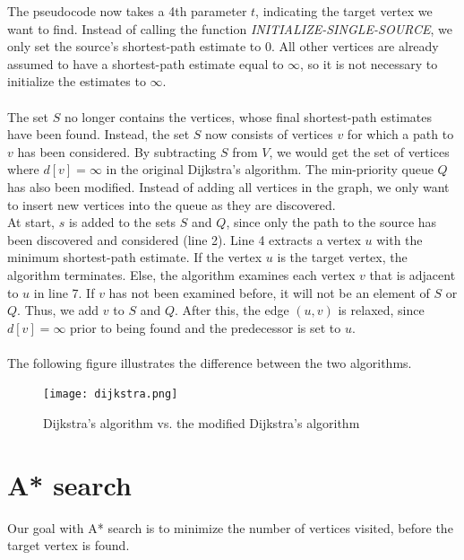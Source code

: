 \documentclass[11pt]{article}
\begin{document}
\noindent The pseudocode now takes a 4th parameter $t$, indicating the target vertex we want to find. Instead of calling the function \textit{INITIALIZE-SINGLE-SOURCE}, we only set the source's shortest-path estimate to 0. All other vertices are already assumed to have a shortest-path estimate equal to $\infty$, so it is not necessary to initialize the estimates to $\infty$.\\\\
The set $S$ no longer contains the vertices, whose final shortest-path estimates have been found. Instead, the set $S$ now consists of vertices $v$ for which a path to $v$ has been considered. By subtracting $S$ from $V$, we would get the set of vertices where $d[v]=\infty$ in the original Dijkstra's algorithm. The min-priority queue $Q$ has also been modified. Instead of adding all vertices in the graph, we only want to insert new vertices into the queue as they are discovered.\\ 
At start, $s$ is added to the sets $S$ and $Q$, since only the path to the source has been discovered and considered (line 2). Line 4 extracts a vertex $u$ with the minimum shortest-path estimate. If the vertex $u$ is the target vertex, the algorithm terminates. Else, the algorithm examines each vertex $v$ that is adjacent to $u$ in line 7. If $v$ has not been examined before, it will not be an element of $S$ or $Q$. Thus, we add $v$ to $S$ and $Q$. After this, the edge $(u,v)$ is relaxed, since $d[v]=\infty$ prior to being found and the predecessor is set to $u$.\\\\
The following figure illustrates the difference between the two algorithms.\\
\begin{figure}[H]
\centering
\texttt{[image: dijkstra.png]}
\caption{Dijkstra's algorithm vs. the modified Dijkstra's algorithm}
\end{figure}


\section{A* search}
Our goal with A* search is to minimize the number of vertices visited, before the target vertex is found.\\\\



\end{document}
